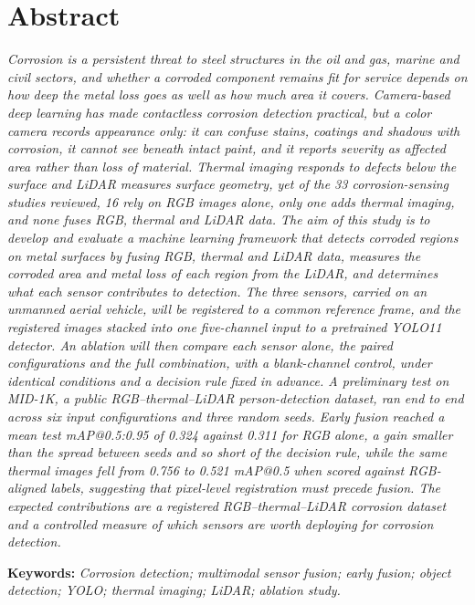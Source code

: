 \chapter*{Abstract}

\emph{Corrosion is a persistent threat to steel structures in the oil and
gas, marine and civil sectors, and whether a corroded component remains fit
for service depends on how deep the metal loss goes as well as how much area
it covers. Camera-based deep learning has made contactless corrosion
detection practical, but a color camera records appearance only: it can
confuse stains, coatings and shadows with corrosion, it cannot see beneath
intact paint, and it reports severity as affected area rather than loss of
material. Thermal imaging responds to defects below the surface and LiDAR
measures surface geometry, yet of the 33 corrosion-sensing studies reviewed,
16 rely on RGB images alone, only one adds thermal imaging, and none fuses
RGB, thermal and LiDAR data. The aim of this
study is to develop and evaluate a machine learning framework that detects
corroded regions on metal surfaces by fusing RGB, thermal and LiDAR data,
measures the corroded area and metal loss of each region from the LiDAR, and
determines what each sensor contributes to detection. The three sensors,
carried on an unmanned aerial vehicle, will be registered to a common
reference frame, and the registered images stacked into one five-channel
input to a pretrained YOLO11 detector. An ablation will then compare each
sensor alone, the paired configurations and the full combination, with a
blank-channel control, under identical conditions and a decision rule fixed
in advance. A
preliminary test on MID-1K, a public RGB--thermal--LiDAR person-detection
dataset, ran end to end across six input configurations and three random
seeds. Early fusion reached a mean test mAP@0.5:0.95 of 0.324 against 0.311
for RGB alone, a gain smaller than the spread between seeds and so short of
the decision rule, while the same thermal images fell from 0.756 to 0.521
mAP@0.5 when scored against RGB-aligned labels, suggesting that pixel-level
registration must precede fusion. The expected contributions are a registered RGB--thermal--LiDAR
corrosion dataset and a controlled measure of which sensors are worth
deploying for corrosion detection.}

\vspace{0.8\baselineskip}

\noindent\textbf{Keywords:} \emph{Corrosion detection; multimodal sensor
fusion; early fusion; object detection; YOLO; thermal imaging; LiDAR; ablation
study.}
